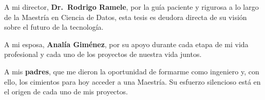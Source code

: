 \documentclass[../00_Main/Main.tex]{subfiles}
\begin{document}
A mi director, \textbf{Dr.\ Rodrigo Ramele}, por la gu\'ia paciente
y rigurosa a lo largo de la Maestr\'ia en Ciencia de Datos, esta tesis 
es deudora directa de su visi\'on sobre el futuro de la tecnolog\'ia.

A mi esposa, \textbf{Anal\'ia Gim\'enez}, por su apoyo durante cada 
etapa de mi vida profesional y cada uno de los proyectos de nuestra vida juntos.

A mis \textbf{padres}, que me dieron la oportunidad de formarme
como ingeniero y, con ello, los cimientos para hoy acceder a una
Maestr\'ia. Su esfuerzo silencioso est\'a en el origen de cada
uno de mis proyectos.

\biblio %
\end{document}
